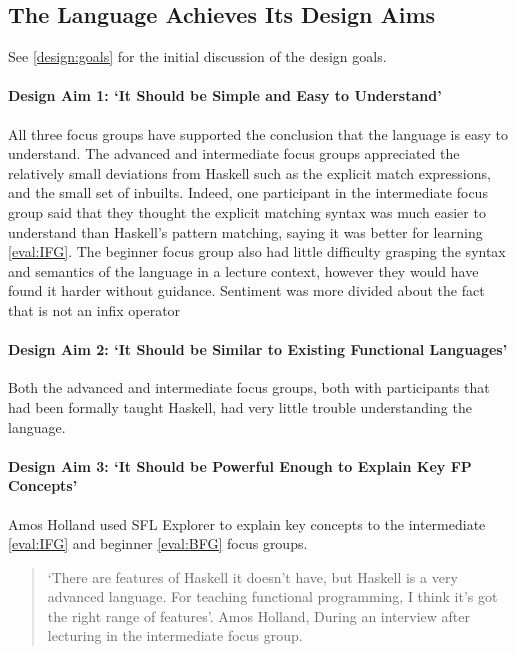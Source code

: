 \subsection{The Language Achieves Its Design Aims}
See \ref{design:goals} for the initial discussion of the design goals. 

\paragraph{Design Aim 1: `It Should be Simple and Easy to Understand'}
All three focus groups have supported the conclusion that the language is easy to understand. The advanced and intermediate focus groups appreciated the relatively small deviations from Haskell such as the explicit match expressions, and the small set of inbuilts. Indeed, one participant in the intermediate focus group said that they thought the explicit matching syntax was much easier to understand than Haskell's pattern matching, saying it was better for learning \ref{eval:IFG}. The beginner focus group also had little difficulty grasping the syntax and semantics of the language in a lecture context, however they would have found it harder without guidance. Sentiment was more divided about the fact that  is not an infix operator


\paragraph{Design Aim 2: `It Should be Similar to Existing Functional Languages'}
Both the advanced and intermediate focus groups, both with participants that had been formally taught Haskell, had very little trouble understanding the language. 

\paragraph{Design Aim 3: `It Should be Powerful Enough to Explain Key \ac{FP} Concepts'}
Amos Holland used SFL Explorer  to explain key concepts to the intermediate \ref{eval:IFG} and beginner \ref{eval:BFG} focus groups. 

\begin{quotation}
\noindent `There are features of Haskell it doesn't have, but Haskell is a very advanced language. For teaching functional programming, I think it's got the right range of features'. Amos Holland, During an interview after lecturing in the intermediate focus group.
\end{quotation}

